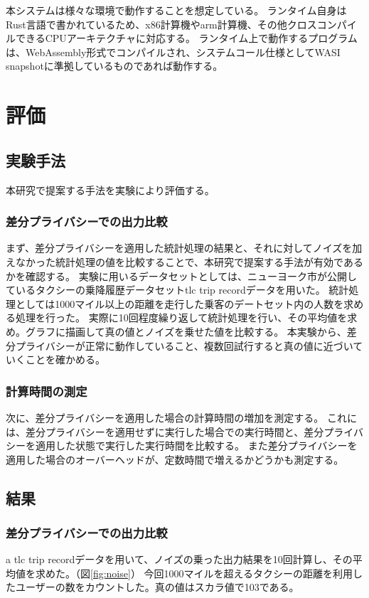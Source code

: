 \documentclass[a4paper,11pt]{jreport}
\begin{document}
本システムは様々な環境で動作することを想定している。
ランタイム自身はRust言語で書かれているため、x86計算機やarm計算機、その他クロスコンパイルできるCPUアーキテクチャに対応する。
ランタイム上で動作するプログラムは、WebAssembly形式でコンパイルされ、システムコール仕様としてWASI snapshotに準拠しているものであれば動作する。


\chapter{評価}
\section{実験手法}
本研究で提案する手法を実験により評価する。

\subsection{差分プライバシーでの出力比較}

まず、差分プライバシーを適用した統計処理の結果と、それに対してノイズを加えなかった統計処理の値を比較することで、本研究で提案する手法が有効であるかを確認する。
実験に用いるデータセットとしては、ニューヨーク市が公開しているタクシーの乗降履歴データセットtlc trip recordデータを用いた。
統計処理としては1000マイル以上の距離を走行した乗客のデートセット内の人数を求める処理を行った。
実際に10回程度繰り返して統計処理を行い、その平均値を求め。グラフに描画して真の値とノイズを乗せた値を比較する。
本実験から、差分プライバシーが正常に動作していること、複数回試行すると真の値に近づいていくことを確かめる。

\subsection{計算時間の測定}

次に、差分プライバシーを適用した場合の計算時間の増加を測定する。
これには、差分プライバシーを適用せずに実行した場合での実行時間と、差分プライバシーを適用した状態で実行した実行時間を比較する。
また差分プライバシーを適用した場合のオーバーヘッドが、定数時間で増えるかどうかも測定する。

\section{結果}
\subsection{差分プライバシーでの出力比較}
a
tlc trip recordデータを用いて、ノイズの乗った出力結果を10回計算し、その平均値を求めた。（図\ref{fig:noise}）
今回1000マイルを超えるタクシーの距離を利用したユーザーの数をカウントした。真の値はスカラ値で103である。
\end{document}
